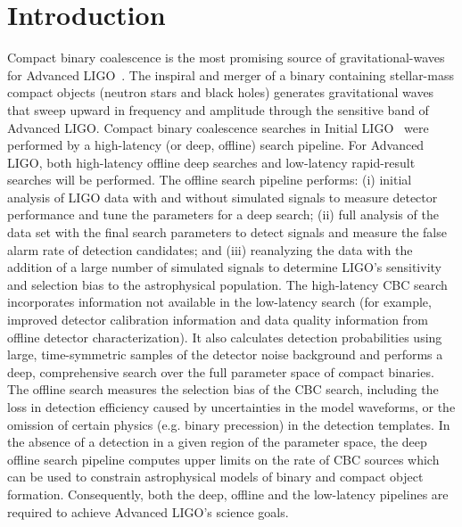 
\section{Introduction}
\vspace*{-5pt}

Compact binary coalescence is the most promising source of gravitational-waves
for Advanced LIGO~\cite{Abadie:2010cf}.  The inspiral and merger of a binary
containing stellar-mass compact objects (neutron stars and black holes)
generates gravitational waves that sweep upward in frequency and amplitude
through the sensitive band of Advanced LIGO. Compact binary coalescence
searches in Initial
LIGO~\cite{LIGOS1iul,Abbott:2005pe,Abbott:2005kq,Abbott:2005qm,Abbott:2007ai,Abbott:2009tt,Abbott:2009qj,Abadie:2010yb,Collaboration:S5HighMass,Colaboration:2011np,Aasi:2013jjl}
were performed by a high-latency (or deep, offline) search pipeline. For Advanced LIGO, both high-latency offline deep searches and low-latency rapid-result searches will be performed. The
offline search pipeline performs: (i) initial analysis of LIGO data with and
without simulated signals to measure detector performance and tune the
parameters for a deep search; (ii) full analysis of the data set with the
final search parameters to detect signals and measure the false alarm rate of
detection candidates; and (iii) reanalyzing the data with the addition of a
large number of simulated signals to determine LIGO's sensitivity and
selection bias to the astrophysical population.
The high-latency CBC search incorporates information not available in the
low-latency search (for example, improved detector calibration information and
data quality information from offline detector characterization). It also
calculates detection probabilities using large,
time-symmetric samples of the detector noise background and performs a deep,
comprehensive search over the full parameter space of compact binaries.
The offline search 
measures the selection bias of the CBC search, including the loss in detection
efficiency caused by uncertainties in the model waveforms, or the omission of
certain physics (e.g. binary precession) in the detection templates.  In the
absence of a detection in a given region of the parameter space, the deep offline
search pipeline computes upper limits on the rate of CBC sources which can be
used to constrain astrophysical models of binary and compact object formation.
Consequently, both the deep, offline and the low-latency pipelines are
required to achieve Advanced LIGO's science goals. 

